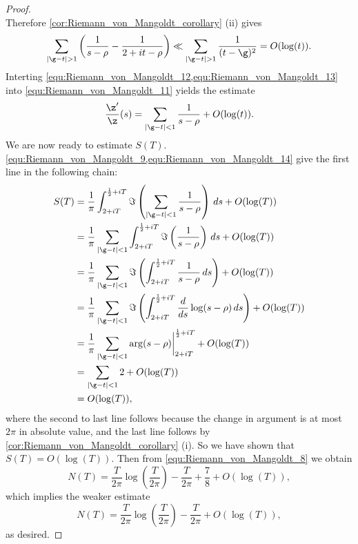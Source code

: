 \begin{proof}
\[        \]
        Therefore \cref{cor:Riemann_von_Mangoldt_corollary} (ii) gives
        \begin{equation}\label{equ:Riemann_von_Mangoldt_13}
          \sum_{|\g-t| > 1}\left(\frac{1}{s-\rho}-\frac{1}{2+it-\rho}\right) \ll \sum_{|\g-t| > 1}\frac{1}{(t-\g)^{2}} = O(\log(t)).
        \end{equation}
        Interting \cref{equ:Riemann_von_Mangoldt_12,equ:Riemann_von_Mangoldt_13} into \cref{equ:Riemann_von_Mangoldt_11} yields the estimate
        \begin{equation}\label{equ:Riemann_von_Mangoldt_14}
          \frac{\z'}{\z}(s) = \sum_{|\g-t| < 1}\frac{1}{s-\rho}+O(\log(t)).
        \end{equation}
        We are now ready to estimate $S(T)$. \cref{equ:Riemann_von_Mangoldt_9,equ:Riemann_von_Mangoldt_14} give the first line in the following chain:
        \begin{align*}
          S(T) &= \frac{1}{\pi}\int_{2+iT}^{\frac{1}{2}+iT}\Im\left(\sum_{|\g-t| < 1}\frac{1}{s-\rho}\right)\,ds+O(\log(T)) \\
          &= \frac{1}{\pi}\sum_{|\g-t| < 1}\int_{2+iT}^{\frac{1}{2}+iT}\Im\left(\frac{1}{s-\rho}\right)\,ds+O(\log(T)) \\
          &= \frac{1}{\pi}\sum_{|\g-t| < 1}\Im\left(\int_{2+iT}^{\frac{1}{2}+iT}\frac{1}{s-\rho}\,ds\right)+O(\log(T)) \\
          &= \frac{1}{\pi}\sum_{|\g-t| < 1}\Im\left(\int_{2+iT}^{\frac{1}{2}+iT}\frac{d}{ds}\log(s-\rho)\,ds\right)+O(\log(T)) \\
          &= \frac{1}{\pi}\sum_{|\g-t| < 1}\arg(s-\rho)\bigg|_{2+iT}^{\frac{1}{2}+iT}+O(\log(T)) \\
          &= \sum_{|\g-t| < 1}2+O(\log(T)) \\
          &= O(\log(T)),
        \end{align*}
        where the second to last line follows because the change in argument is at most $2\pi$ in absolute value, and the last line follows by \cref{cor:Riemann_von_Mangoldt_corollary} (i). So we have shown that $S(T) = O(\log(T))$. Then from \cref{equ:Riemann_von_Mangoldt_8} we obtain
        \[
          N(T) = \frac{T}{2\pi}\log\left(\frac{T}{2\pi}\right)-\frac{T}{2\pi}+\frac{7}{8}+O(\log(T)),
        \]
        which implies the weaker estimate
        \[
          N(T) = \frac{T}{2\pi}\log\left(\frac{T}{2\pi}\right)-\frac{T}{2\pi}+O(\log(T)),
        \]
        as desired.
      \end{proof}

